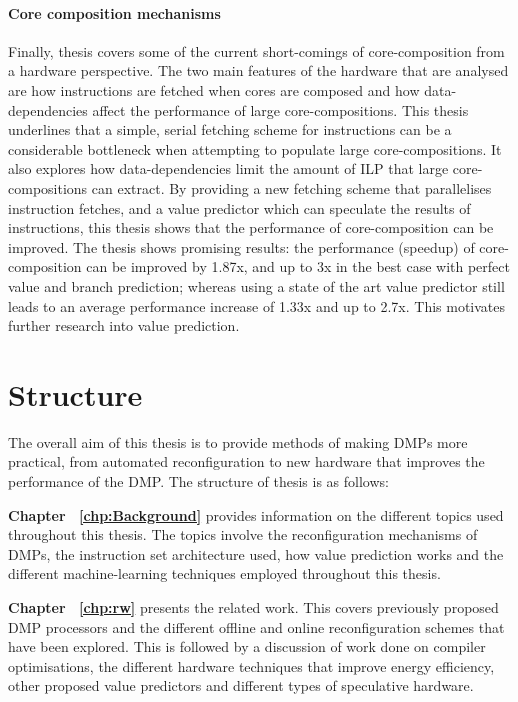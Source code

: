 \paragraph*{Core composition mechanisms} 
Finally, thesis covers some of the current short-comings of core-composition from a hardware perspective.
The two main features of the hardware that are analysed are how instructions are fetched when cores are composed and how data-dependencies affect the performance of large core-compositions.
This thesis underlines that a simple, serial fetching scheme for instructions can be a considerable bottleneck when attempting to populate large core-compositions.
It also explores how data-dependencies limit the amount of ILP that large core-compositions can extract.
By providing a new fetching scheme that parallelises instruction fetches, and a value predictor which can speculate the results of instructions, this thesis shows that the performance of core-composition can be improved.
The thesis shows promising results: the performance (speedup) of core-composition can be improved by 1.87x, and up to 3x in the best case with perfect value and branch prediction; whereas using a state of the art value predictor still leads to an average performance increase of 1.33x and up to 2.7x.
This motivates further research into value prediction.

\section{Structure}
The overall aim of this thesis is to provide methods of making DMPs more practical, from automated reconfiguration to new hardware that improves the performance of the DMP.
The structure of thesis is as follows:

\textbf{Chapter ~\ref{chp:Background}} provides information on the different topics used throughout this thesis. The topics involve the reconfiguration mechanisms of DMPs, the instruction set architecture used, how value prediction works and the different machine-learning techniques employed throughout this thesis.

\textbf{Chapter ~\ref{chp:rw}} presents the related work. This covers previously proposed DMP processors and the different offline and online reconfiguration schemes that have been explored. 
This is followed by a discussion of work done on compiler optimisations, the different hardware techniques that improve energy efficiency, other proposed value predictors and different types of speculative hardware.

